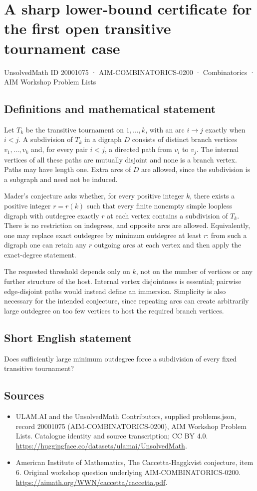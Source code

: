 \documentclass[11pt,a4paper]{article}
\begin{document}
\section*{A sharp lower-bound certificate for the first open transitive tournament case}\label{20001075}
{\small UnsolvedMath ID 20001075 · AIM-COMBINATORICS-0200 · Combinatorics · AIM Workshop Problem Lists}
\subsection{Definitions and mathematical statement}
Let $T_k$ be the transitive tournament on $1,\ldots,k$, with an arc
$i\to j$ exactly when $i<j$. A subdivision of $T_k$ in a digraph
$D$ consists of distinct branch vertices $v_1,\ldots,v_k$ and, for
every pair $i<j$, a directed path from $v_i$ to $v_j$.
The internal vertices of all these paths are mutually disjoint and
none is a branch vertex. Paths may have length one. Extra arcs of
$D$ are allowed, since the subdivision is a subgraph and need not
be induced.

Mader's conjecture asks whether, for every positive integer $k$,
there exists a positive integer $r=r(k)$ such that every finite
nonempty simple loopless digraph with outdegree exactly $r$ at each
vertex contains a subdivision of $T_k$. There is no restriction on
indegrees, and opposite arcs are allowed. Equivalently, one may
replace exact outdegree by minimum outdegree at least $r$: from
such a digraph one can retain any $r$ outgoing arcs at each vertex
and then apply the exact-degree statement.

The requested threshold depends only on $k$, not on the number of
vertices or any further structure of the host. Internal vertex
disjointness is essential; pairwise edge-disjoint paths would instead
define an immersion. Simplicity is also necessary for the intended
conjecture, since repeating arcs can create arbitrarily large
outdegree on too few vertices to host the required branch vertices.
\subsection{Short English statement}
Does sufficiently large minimum outdegree force a subdivision of every fixed transitive tournament?
\subsection{Sources}
\begin{itemize}
\item[S1] ULAM.AI and the UnsolvedMath Contributors, supplied problems.json, record 20001075 (AIM-COMBINATORICS-0200), AIM Workshop Problem Lists. Catalogue identity and source transcription; CC BY 4.0.
\url{https://huggingface.co/datasets/ulamai/UnsolvedMath}.
\item[S2] American Institute of Mathematics, The Caccetta-Haggkvist conjecture, item 6. Original workshop question underlying AIM-COMBINATORICS-0200.
\url{https://aimath.org/WWN/caccetta/caccetta.pdf}.
\end{itemize}
\end{document}
